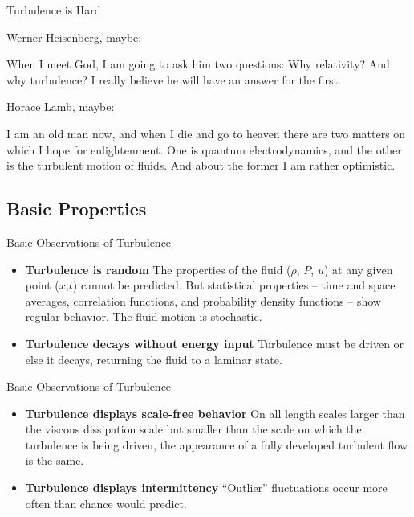 \begin{frame}{Turbulence is Hard}

Werner Heisenberg, maybe:
\begin{fancyquotes}
	When I meet God, I am going to ask him two questions: Why relativity? And why turbulence? I really believe he will have an answer for the first.
\end{fancyquotes}

Horace Lamb, maybe:
\begin{fancyquotes}
	I am an old man now, and when I die and go to heaven there are two matters on which I hope for enlightenment. One is quantum electrodynamics, and the other is the turbulent motion of fluids. And about the former I am rather optimistic.
\end{fancyquotes}

\end{frame}


\subsection{Basic Properties}
\begin{frame}{Basic Observations of Turbulence}
\begin{itemize}
\item \textbf{Turbulence is random} \newline The properties of the fluid ($\rho$, $P$, $u$) at any given point ($x$,$t$) cannot be predicted. But statistical properties – time and space averages, correlation functions, and probability density functions – show regular behavior. The fluid motion is stochastic.
\item \textbf{Turbulence decays without energy input} \newline Turbulence must be driven or else it decays, returning the fluid to a laminar state.
\end{itemize}
\end{frame}


\begin{frame}{Basic Observations of Turbulence}
\begin{itemize}
\item \textbf{Turbulence displays scale-free behavior} \newline On all length scales larger than the viscous dissipation scale but smaller than the scale on which the turbulence is being driven, the appearance of a fully developed turbulent flow is the same.
\item \textbf{Turbulence displays intermittency} \newline ``Outlier'' fluctuations occur more often than chance would predict.
\end{itemize}
\end{frame}

